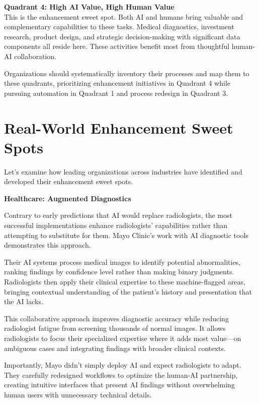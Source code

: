 \documentclass[
  Letterpaper,
]{scrbook}
\begin{document}
\textbf{Quadrant 4: High AI Value, High Human Value}\\
This is the enhancement sweet spot. Both AI and humans bring valuable
and complementary capabilities to these tasks. Medical diagnostics,
investment research, product design, and strategic
decision-making with significant data
components all reside here. These activities benefit most from
thoughtful human-AI
collaboration.

Organizations should systematically inventory their processes and map
them to these quadrants, prioritizing enhancement initiatives in
Quadrant 4 while pursuing automation in Quadrant 1 and process redesign
in Quadrant 3.

\section{Real-World Enhancement Sweet
Spots}\label{real-world-enhancement-sweet-spots}

Let's examine how leading organizations across industries have
identified and developed their enhancement sweet spots.

\textbf{Healthcare: Augmented Diagnostics}

Contrary to early predictions that AI would replace radiologists, the
most successful implementations enhance radiologists' capabilities
rather than attempting to substitute for them. Mayo
Clinic's work with AI diagnostic tools
demonstrates this approach.

Their AI systems process medical images to identify potential
abnormalities, ranking findings by confidence level rather than making
binary judgments. Radiologists then apply their clinical expertise to
these machine-flagged areas, bringing contextual understanding of the
patient's history and presentation that the AI lacks.

This collaborative approach improves diagnostic accuracy while reducing
radiologist fatigue from screening thousands of normal images. It allows
radiologists to focus their specialized expertise where it adds most
value---on ambiguous cases and integrating findings with broader
clinical contexts.

Importantly, Mayo didn't simply deploy AI and expect radiologists to
adapt. They carefully redesigned workflows to optimize the human-AI
partnership, creating intuitive interfaces that present AI findings
without overwhelming human users with unnecessary technical details.
\end{document}
